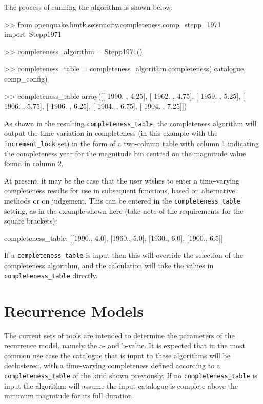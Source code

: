 The process of running the algorithm is shown below:

\begin{python}[frame=single]
>> from openquake.hmtk.seismicity.completeness.comp_stepp_1971 import\
    Stepp1971

>> completeness_algorithm = Stepp1971()

>> completeness_table = completeness_algorithm.completeness(
    catalogue,
    comp_config)

>> completeness_table 
array([[ 1990.  ,     4.25],
       [ 1962.  ,     4.75],
       [ 1959.  ,     5.25],
       [ 1906.  ,     5.75],
       [ 1906.  ,     6.25],
       [ 1904.  ,     6.75],
       [ 1904.  ,     7.25]])
\end{python}

As shown in the resulting \verb=completeness_table=, the completeness algorithm will output the time variation in completeness (in this example with the \verb=increment_lock= set) in the form of a two-column table with column 1 indicating the completeness year for the magnitude bin centred on the magnitude value found in column 2.

At present, it may be the case that the user wishes to enter a time-varying completeness results for use in subsequent functions, based on alternative methods or on judgement. This can be entered in the \verb=completeness_table= setting, as in the example shown here (take note of the requirements for the square brackets):

\begin{python}[frame=single]
completeness_table: [[1990., 4.0],
                     [1960., 5.0],
                     [1930., 6.0],
                     [1900., 6.5]]
\end{python}

If a \verb=completeness_table= is input then this will override the selection of the completeness algorithm, and the calculation will take the values in \verb=completeness_table= directly. 


\section{Recurrence Models}

The current sets of tools are intended to determine the parameters of the \textcite{GutenbergRichter1944} recurrence model, namely the a- and b-value. It is expected that in the most common use case the catalogue that is input to these algorithms will be declustered, with a time-varying completeness defined according to a \verb=completeness_table= of the kind shown previously. If no \verb=completeness_table= is input the algorithm will assume the input catalogue is complete above the minimum magnitude for its full duration.

